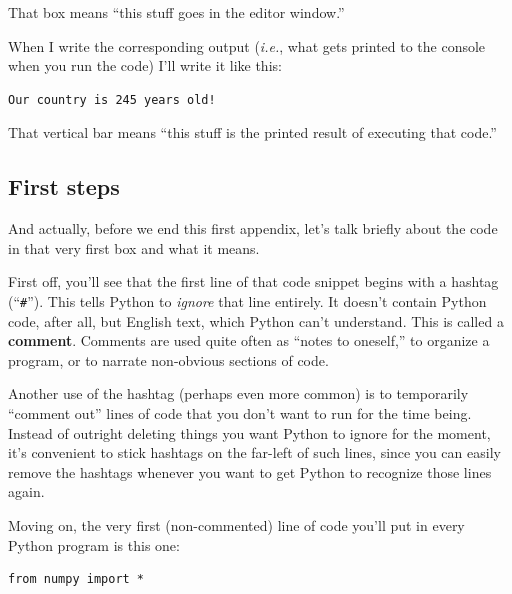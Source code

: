 That box means ``this stuff goes in the editor window.''

\medskip

When I write the corresponding output (\textit{i.e.}, what gets printed to the
console when you run the code) I'll write it like this:

\vspace{-.1in}
\begin{Verbatim}[fontsize=\small,samepage=true,frame=leftline,framesep=5mm,framerule=1mm]
Our country is 245 years old!
\end{Verbatim}
\vspace{-.1in}

That vertical bar means ``this stuff is the printed result of executing that
code.''

\medskip

\subsection*{First steps}

And actually, before we end this first appendix, let's talk briefly about the
code in that very first box and what it means.


First off, you'll see that the first line of that code snippet begins with a
hashtag (``\texttt{\#}''). This tells Python to \textit{ignore} that line
entirely. It doesn't contain Python code, after all, but English text, which
Python can't understand. This is called a \textbf{comment}. Comments are used
quite often as ``notes to oneself,'' to organize a program, or to narrate
non-obvious sections of code.

Another use of the hashtag (perhaps even more common) is to temporarily
``comment out'' lines of code that you don't want to run for the time being.
Instead of outright deleting things you want Python to ignore for the moment,
it's convenient to stick hashtags on the far-left of such lines, since you can
easily remove the hashtags whenever you want to get Python to recognize those
lines again.

\smallskip

Moving on, the very first (non-commented) line of code you'll put in every
Python program is this one:

\label{importNumpy}
\begin{Verbatim}[fontsize=\small,samepage=true,frame=single,framesep=3mm]
from numpy import *
\end{Verbatim}


